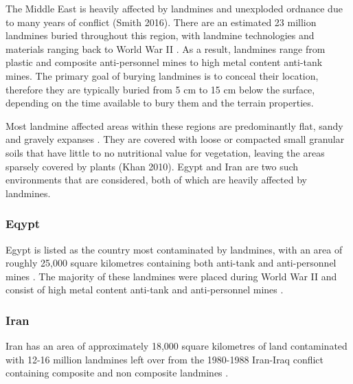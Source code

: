 \documentclass[main.tex]{subfiles}
\begin{document}
The Middle East is heavily affected by landmines and unexploded ordnance due to many years of conflict (Smith 2016). There are an estimated 23 million landmines buried throughout this region, with landmine technologies and materials ranging back to World War II \parencite{Khamis13}. As a result, landmines range from plastic and composite anti-personnel mines to high metal content anti-tank mines. The primary goal of burying landmines is to conceal their location, therefore they are typically buried from 5 cm to 15 cm below the surface, depending on the time available to bury them and the terrain properties.

Most landmine affected areas within these regions are predominantly flat, sandy and gravely expanses \parencite{Nahrawy2011}. They are covered with loose or compacted small granular soils that have little to no nutritional value for vegetation, leaving the areas sparsely covered by plants (Khan 2010).  
Egypt and Iran are two such environments that are considered, both of which are heavily affected by landmines.

\subsubsection{Eqypt}

Egypt is listed as the country most contaminated by landmines, with an area of roughly 25,000 square kilometres containing both anti-tank and anti-personnel mines \parencite{Rushfan2008}. The majority of these landmines were placed during World War II and consist of high metal content anti-tank and anti-personnel mines \parencite{Khamis13}. %

\subsubsection{Iran}
Iran has an area of approximately 18,000 square kilometres of land contaminated with 12-16 million landmines left over from the 1980-1988 Iran-Iraq conflict containing composite and non composite landmines \parencite{landmineMonitor2015}. %
\end{document}
